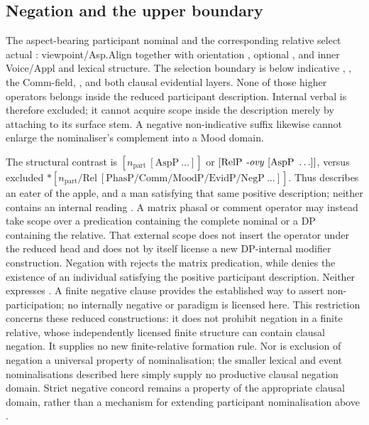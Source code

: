 \subsection{Negation and the upper boundary}
The aspect-bearing participant nominal and the corresponding 
relative select actual : viewpoint/Asp.Align together with
orientation , optional , and inner
Voice/Appl and lexical structure. The selection boundary is below indicative
, , the Comm-field, , and both
clausal evidential layers. None of those higher operators belongs inside the
reduced participant description. Internal verbal  is therefore
excluded; it cannot acquire scope inside the description merely by attaching
to its surface stem. A negative non-indicative suffix likewise cannot enlarge
the nominaliser's complement into a Mood domain.

The structural contrast is
$[n_{\mathrm{part}}\ [\mathrm{AspP}\ \ldots]]$ or
$[\mathrm{RelP}\ \text{\ird{-ovy}}\ [\mathrm{AspP}\ \ldots]]$, versus excluded
$*[n_{\mathrm{part}}/\mathrm{Rel}\ [\mathrm{PhasP}/\mathrm{Comm}/
\mathrm{MoodP}/\mathrm{EvidP}/\mathrm{NegP}\ \ldots]]$.
Thus  describes an eater of the apple, and
 a man satisfying that same positive description;
neither contains an internal reading . A matrix phasal or comment operator may instead take scope over a
predication containing the complete nominal or a DP containing the relative.
That external scope does not insert the operator under the reduced head and
does not by itself license a new DP-internal modifier construction. Negation with
 rejects the matrix predication, while  denies the
existence of an individual satisfying the positive participant description.
Neither expresses . A finite negative clause
provides the established way to assert non-participation; no internally
negative  or  paradigm is licensed here. This restriction
concerns these reduced constructions: it does not prohibit negation in a
finite relative, whose independently licensed finite structure can contain
clausal negation. It supplies no new finite-relative formation rule. Nor is
exclusion of negation a universal property of nominalisation; the smaller
lexical and event nominalisations described here simply supply no productive
clausal negation domain. Strict negative concord remains a property of the
appropriate clausal domain, rather than a mechanism for extending participant
nominalisation above .

